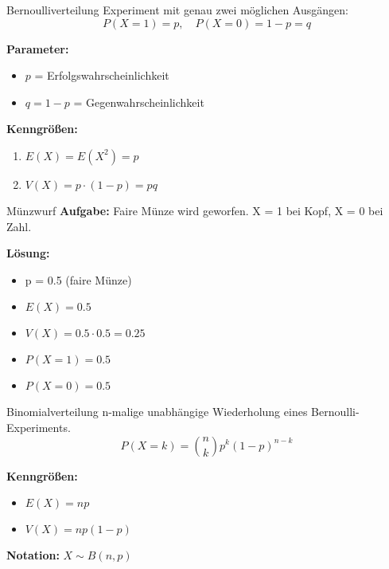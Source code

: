 \begin{definition}{Bernoulliverteilung}
Experiment mit genau zwei möglichen Ausgängen:
$$
P(X=1)=p, \quad P(X=0)=1-p=q
$$

\textbf{Parameter:}
\begin{itemize}
    \item $p$ = Erfolgswahrscheinlichkeit
    \item $q = 1-p$ = Gegenwahrscheinlichkeit
\end{itemize}

\textbf{Kenngrößen:}
\begin{enumerate}
    \item $E(X)=E(X^2)=p$
    \item $V(X)=p \cdot(1-p)=pq$
\end{enumerate}
\end{definition}

\begin{example}{Münzwurf}
\textbf{Aufgabe:} Faire Münze wird geworfen. X = 1 bei Kopf, X = 0 bei Zahl.

\textbf{Lösung:}
\begin{itemize}
\item p = 0.5 (faire Münze)
\item $E(X) = 0.5$
\item $V(X) = 0.5 \cdot 0.5 = 0.25$
\item $P(X=1) = 0.5$
\item $P(X=0) = 0.5$
\end{itemize}
\end{example}

\begin{definition}{Binomialverteilung}
n-malige unabhängige Wiederholung eines Bernoulli-Experiments.
$$P(X=k) = \binom{n}{k}p^k(1-p)^{n-k}$$

\textbf{Kenngrößen:}
\begin{itemize}
    \item $E(X) = np$
    \item $V(X) = np(1-p)$
\end{itemize}

\textbf{Notation:} $X \sim B(n,p)$
\end{definition}

